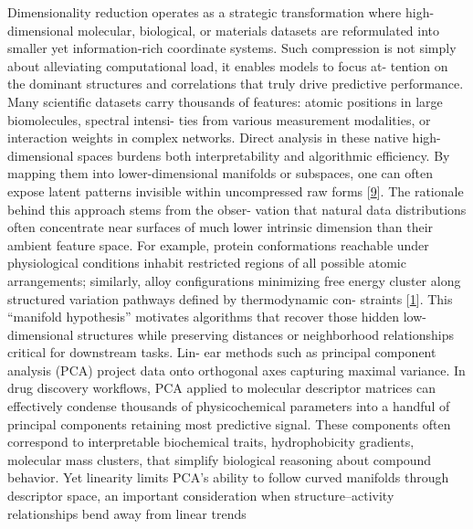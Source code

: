 \documentclass[
]{article}
\begin{document}
Dimensionality reduction operates as a strategic transformation where
high-dimensional molecular, biological, or materials datasets are
reformulated into smaller yet information-rich coordinate systems. Such
compression is not simply about alleviating computational load, it
enables models to focus at- tention on the dominant structures and
correlations that truly drive predictive performance. Many scientific
datasets carry thousands of features: atomic positions in large
biomolecules, spectral intensi- ties from various measurement
modalities, or interaction weights in complex networks. Direct analysis
in these native high-dimensional spaces burdens both interpretability
and algorithmic efficiency. By mapping them into lower-dimensional
manifolds or subspaces, one can often expose latent patterns invisible
within uncompressed raw forms {[}\protect\hyperlink{_bookmark49}{9}{]}.
The rationale behind this approach stems from the obser- vation that
natural data distributions often concentrate near surfaces of much lower
intrinsic dimension than their ambient feature space. For example,
protein conformations reachable under physiological conditions inhabit
restricted regions of all possible atomic arrangements; similarly, alloy
configurations minimizing free energy cluster along structured variation
pathways defined by thermodynamic con- straints
{[}\protect\hyperlink{_bookmark41}{1}{]}. This ``manifold hypothesis''
motivates algorithms that recover those hidden low-dimensional
structures while preserving distances or neighborhood relationships
critical for downstream tasks. Lin- ear methods such as principal
component analysis (PCA) project data onto orthogonal axes capturing
maximal variance. In drug discovery workflows, PCA applied to molecular
descriptor matrices can effectively condense thousands of
physicochemical parameters into a handful of principal components
retaining most predictive signal. These components often correspond to
interpretable biochemical traits, hydrophobicity gradients, molecular
mass clusters, that simplify biological reasoning about compound
behavior. Yet linearity limits PCA's ability to follow curved manifolds
through descriptor space, an important consideration when
structure--activity relationships bend away from linear trends
\end{document}
